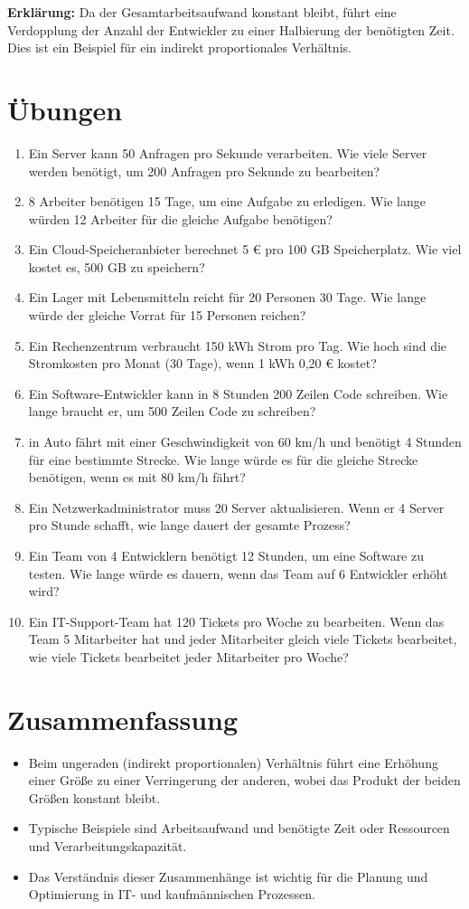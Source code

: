 \documentclass{orgstandard}
\begin{document}
\textbf{\textbf{Erklärung:}}
Da der Gesamtarbeitsaufwand konstant bleibt, führt eine Verdopplung der Anzahl der Entwickler zu einer Halbierung der benötigten Zeit. Dies ist ein Beispiel für ein indirekt proportionales Verhältnis.

\section{Übungen}
\label{sec:org7b5f9c3}
\begin{enumerate}
\item Ein Server kann 50 Anfragen pro Sekunde verarbeiten. Wie viele Server werden benötigt, um 200 Anfragen pro Sekunde zu bearbeiten?
\item 8 Arbeiter benötigen 15 Tage, um eine Aufgabe zu erledigen. Wie lange würden 12 Arbeiter für die gleiche Aufgabe benötigen?
\item Ein Cloud-Speicheranbieter berechnet 5 € pro 100 GB Speicherplatz. Wie viel kostet es, 500 GB zu speichern?
\item Ein Lager mit Lebensmitteln reicht für 20 Personen 30 Tage. Wie lange würde der gleiche Vorrat für 15 Personen reichen?
\item Ein Rechenzentrum verbraucht 150 kWh Strom pro Tag. Wie hoch sind die Stromkosten pro Monat (30 Tage), wenn 1 kWh 0,20 € kostet?
\item Ein Software-Entwickler kann in 8 Stunden 200 Zeilen Code schreiben. Wie lange braucht er, um 500 Zeilen Code zu schreiben?
\item in Auto fährt mit einer Geschwindigkeit von 60 km/h und benötigt 4 Stunden für eine bestimmte Strecke. Wie lange würde es für die gleiche Strecke benötigen, wenn es mit 80 km/h fährt?
\item Ein Netzwerkadministrator muss 20 Server aktualisieren. Wenn er 4 Server pro Stunde schafft, wie lange dauert der gesamte Prozess?
\item Ein Team von 4 Entwicklern benötigt 12 Stunden, um eine Software zu testen. Wie lange würde es dauern, wenn das Team auf 6 Entwickler erhöht wird?
\item Ein IT-Support-Team hat 120 Tickets pro Woche zu bearbeiten. Wenn das Team 5 Mitarbeiter hat und jeder Mitarbeiter gleich viele Tickets bearbeitet, wie viele Tickets bearbeitet jeder Mitarbeiter pro Woche?
\end{enumerate}


\section{Zusammenfassung}
\label{sec:orgf63eb66}
\begin{itemize}
\item Beim ungeraden (indirekt proportionalen) Verhältnis führt eine Erhöhung einer Größe zu einer Verringerung der anderen, wobei das Produkt der beiden Größen konstant bleibt.
\item Typische Beispiele sind Arbeitsaufwand und benötigte Zeit oder Ressourcen und Verarbeitungskapazität.
\item Das Verständnis dieser Zusammenhänge ist wichtig für die Planung und Optimierung in IT- und kaufmännischen Prozessen.
\end{itemize}
\end{document}
